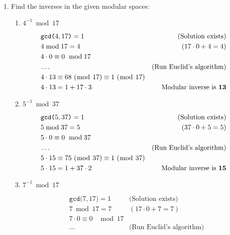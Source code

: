 \documentclass[12pt]{article}
\newenvironment{answer}
{ \begin{tcolorbox}[halign=left]
    }
    {  
  \end{tcolorbox}
}
\begin{document}
\begin{enumerate}
\begin{enumerate}
  \item Find the inverses in the given modular spaces:
    \begin{enumerate}
    \item $4^{-1} \bmod 17$
      \begin{answer}
        \begin{align*}
          &\texttt{gcd(}4,17\texttt{)} = 1 & \text{(Solution exists)} \\
          &4 \bmod 17 = 4 & (17 \cdot 0 + 4 = 4)\\
          &4 \cdot 0 \equiv 0 \text{ } \bmod 17 & \\
          &\ldots & \text{(Run Euclid's algorithm)} \\
          &4 \cdot 13 \equiv 68 \text{ } (\bmod \text{ } 17) \equiv 1 \text{ } (\bmod \text{ } 17)  & \\
          &4 \cdot 13 = 1 + 17 \cdot 3 & \text{Modular inverse is \textbf{13}} \\
        \end{align*}
      \end{answer}
    \item $5^{-1} \bmod 37$
      \begin{answer}
        \begin{align*}
          &\texttt{gcd(}5,37\texttt{)} = 1 & \text{(Solution exists)} \\
          &5 \bmod 37 = 5 & (37 \cdot 0 + 5 = 5)\\
          &5 \cdot 0 \equiv 0 \text{ } \bmod 37 & \\
          &\ldots & \text{(Run Euclid's algorithm)} \\
          &5 \cdot 15 \equiv 75 \text{ } (\bmod \text{ } 37) \equiv 1 \text{ } (\bmod \text{ } 37)  & \\
          &5 \cdot 15 = 1 + 37 \cdot 2 & \text{Modular inverse is \textbf{15}} \\
        \end{align*}
      \end{answer}
    \item $7^{-1} \bmod 17$
      \begin{answer}
        \begin{align*}
          &\texttt{gcd(}7,17\texttt{)} = 1 & \text{(Solution exists)} \\
          &7 \bmod 17 = 7 & (17 \cdot 0 + 7 = 7)\\
          &7 \cdot 0 \equiv 0 \text{ } \bmod 17 & \\
          &\ldots & \text{(Run Euclid's algorithm)} \\

\end{align*}
\end{answer}
\end{enumerate}
\end{enumerate}
\end{enumerate}
\end{document}

